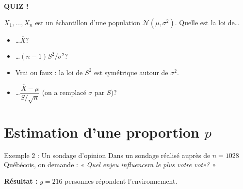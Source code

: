 \documentclass{BeamerTemplate}
\begin{document}
\begin{frame}[plain,t]
  \centerline{\LARGE\bfseries\alert{QUIZ !}}

  \medskip
  $X_1, \ldots, X_n$ est un échantillon d'une population $\mathcal{N}(\mu, \sigma^2)$. Quelle est la loi de\ldots
  \begin{itemize}\itemsep 5mm
    \item \ldots $\overline{X}$?
    \item \ldots $(n-1)S^2/\sigma^2$?
    \item Vrai ou faux : la loi de $S^2$ est symétrique autour de $\sigma^2$.\\
    \item \ldots $\dfrac{\overline{X} - \mu}{S/\sqrt{n}}$ (on a remplacé $\sigma$ par $S$)?\\
  \end{itemize}
\end{frame}

\section{Estimation d'une proportion \texorpdfstring{$p$}{p}}

\begin{frame}[t]{Exemple 2 : Un sondage d'opinion}
  Dans un sondage réalisé auprès de $n = 1028$ Québécois, on demande : \emph{« Quel enjeu influencera le plus votre vote? »}

  \medskip
  \textbf{Résultat :} $y = 216$ personnes répondent l'environnement.

  \bigskip

  \bigskip
\end{frame}
\end{document}
